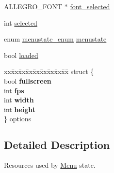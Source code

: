 \begin{DoxyCompactItemize}
A\-L\-L\-E\-G\-R\-O\-\_\-\-F\-O\-N\-T $\ast$ \hyperlink{structMenu_a577ad17dfddafaae41dde63ca7970003}{font\-\_\-selected}
\item 
int \hyperlink{structMenu_a608e2768a5458057048bf1c7ab9a81aa}{selected}
\item 
enum \hyperlink{main_8h_a5b988954c565e5ff444d61085e367fae}{menustate\-\_\-enum} \hyperlink{structMenu_a6c264952ac073cf2f290de86a677c876}{menustate}
\item 
bool \hyperlink{structMenu_afd245b822f2805677609fc0f78ee59ac}{loaded}
\item 
\begin{tabbing}
xx\=xx\=xx\=xx\=xx\=xx\=xx\=xx\=xx\=\kill
struct \{\\
\>bool {\bfseries fullscreen}\\
\>int {\bfseries fps}\\
\>int {\bfseries width}\\
\>int {\bfseries height}\\
\} \hyperlink{structMenu_a126bbd1f3999e0e0f9f568282a1ca00b}{options}\\

\end{tabbing}\end{DoxyCompactItemize}


\subsection{Detailed Description}
Resources used by \hyperlink{structMenu}{Menu} state. 

